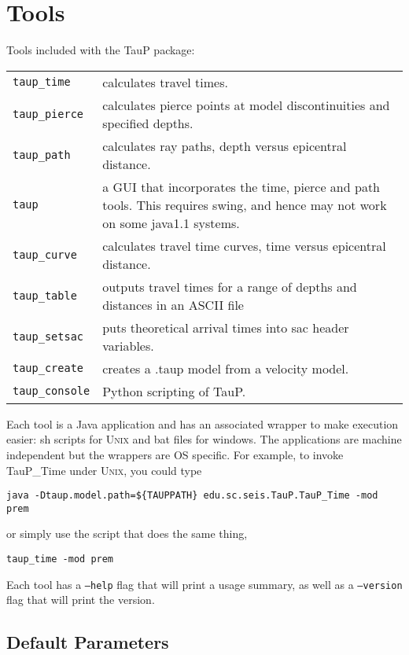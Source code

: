 
\section{Tools}

Tools included with the TauP package:

\begin{center}
\begin{tabular}{lp{3.2in}}

\texttt{taup\_time} & 
  calculates travel times. \\
\texttt{taup\_pierce} & 
  calculates pierce points at model discontinuities and specified depths. \\
\texttt{taup\_path} & calculates ray paths, depth versus epicentral distance. \\
\texttt{taup} & a GUI that incorporates the time, pierce and path tools. This
requires swing, and hence may not work on some java1.1 systems. \\
\texttt{taup\_curve} & 
  calculates travel time curves, time versus epicentral distance. \\
\texttt{taup\_table} & outputs travel times for a range of depths and distances in an ASCII file \\
\texttt{taup\_setsac} & 
  puts theoretical arrival times into sac header variables. \\
\texttt{taup\_create} & 
  creates a .taup model from a velocity model. \\
\texttt{taup\_console} & Python scripting of TauP. \\
\end{tabular}
\end{center}

Each tool is a Java application and has an associated wrapper to make
execution easier: sh scripts 
for \textsc{Unix} and
bat files for windows.  The applications are machine independent but the 
wrappers are OS specific. 
For example, to invoke TauP\_Time under \textsc{Unix}, you could type

\texttt{java -Dtaup.model.path=\$\{TAUPPATH\} edu.sc.seis.TauP.TauP\_Time -mod prem}

or simply use the script that does the same thing,

\texttt{taup\_time -mod prem}

Each tool has a \texttt{--help} flag that will print a usage summary, as well
as a \texttt{--version} flag that will print the version.

\subsection{Default Parameters} \label{properties}

